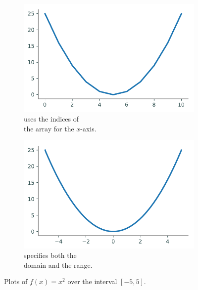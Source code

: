 \begin{figure}[H] %
\captionsetup[subfigure]{justification=centering}
\centering
\begin{subfigure}{.5\textwidth}
    \centering
    \includegraphics[width=\linewidth]{figures/basic1.pdf}
    \caption{ uses the indices of\\the array for the $x$-axis.}
    \label{fig:basic1}
\end{subfigure}%
\begin{subfigure}{.5\textwidth}
    \centering
    \includegraphics[width=\linewidth]{figures/basic2.pdf}
    \caption{ specifies both the\\domain and the range.}
    \label{fig:basic2}
\end{subfigure}
\caption{Plots of $f(x) = x^2$ over the interval $[-5,5]$.}
\end{figure}

